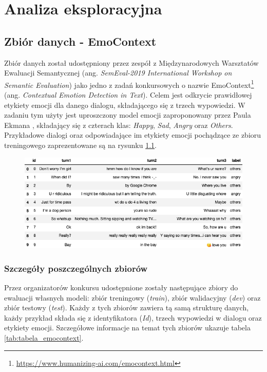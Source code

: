 \chapter{Analiza eksploracyjna}

\section{Zbiór danych - EmoContext}

Zbiór danych został udostępniony przez zespół z Międzynarodowych Warsztatów Ewaluacji Semantycznej (ang. \textit{SemEval-2019 International Workshop on Semantic Evaluation}) jako jedno z zadań konkursowych o nazwie EmoContext\footnote{\url{https://www.humanizing-ai.com/emocontext.html}} (ang. \textit{Contextual Emotion Detection in Text}).  Celem jest odkrycie prawidłowej etykiety emocji dla danego dialogu, składającego się z trzech wypowiedzi. W zadaniu tym użyty jest uproszczony model emocji zaproponowany przez Paula Ekmana \cite{ekman1993facial}, składający się z czterach klas: \textit{Happy}, \textit{Sad}, \textit{Angry} oraz \textit{Others}. Przykładowe dialogi oraz odpowiadające im etykiety emocji pochądzące ze zbioru treningowego zaprezentowane są na rysunku \ref{rys:examples_semeval}.

\begin{figure}[h]
\centering\includegraphics[width=12cm]{figures/examples_semeval.png}
\label{rys:examples_semeval}
\end{figure}

\subsection{Szczegóły poszczególnych zbiorów}

Przez organizatorów konkursu udostępnione zostały następujące zbiory do ewaluacji własnych modeli: zbiór treningowy (\textit{train}), zbiór walidacyjny (\textit{dev}) oraz zbiór testowy (\textit{test}). Każdy z tych zbiorów zawiera tą samą strukturę danych, każdy przykład składa się z identyfikatora (\textit{Id}), trzech wypowiedzi w dialogu oraz etykiety emocji. Szczegółowe informacje na temat tych zbiorów ukazuje tabela \ref{tab:tabela_emocontext}.


